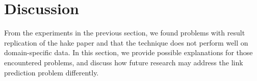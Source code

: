 \section{Discussion}\label{sec:discussion}

From the experiments in the previous section, we found problems with result replication of the \ac{hake} paper and that the technique does not perform well on domain-specific data.
In this section, we provide possible explanations for those encountered problems, and discuss how future research may address the link prediction problem differently.




